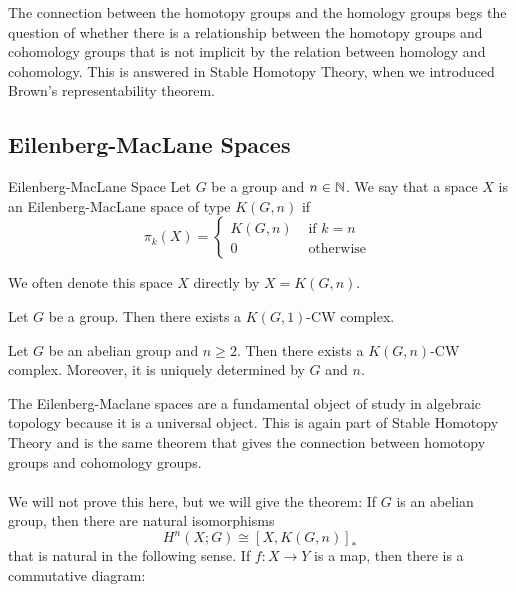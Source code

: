 \documentclass[a4paper]{article}
\begin{document}
The connection between the homotopy groups and the homology groups begs the question of whether there is a relationship between the homotopy groups and cohomology groups that is not implicit by the relation between homology and cohomology. This is answered in Stable Homotopy Theory, when we introduced Brown's representability theorem. 

\subsection{Eilenberg-MacLane Spaces}
\begin{defn}{Eilenberg-MacLane Space}{} Let $G$ be a group and $n\in\mathbb{N}$. We say that a space $X$ is an Eilenberg-MacLane space of type $K(G,n)$ if $$\pi_k(X)=\begin{cases}
K(G,n) & \text{ if } k=n\\
0 & \text{ otherwise }
\end{cases}$$
\end{defn}

We often denote this space $X$ directly by $X=K(G,n)$. 

\begin{prp}{}{} Let $G$ be a group. Then there exists a $K(G,1)$-CW complex. 
\end{prp}

\begin{thm}{}{} Let $G$ be an abelian group and $n\geq 2$. Then there exists a $K(G,n)$-CW complex. Moreover, it is uniquely determined by $G$ and $n$. 
\end{thm}

The Eilenberg-Maclane spaces are a fundamental object of study in algebraic topology because it is a universal object. This is again part of Stable Homotopy Theory and is the same theorem that gives the connection between homotopy groups and cohomology groups. \\~\\

We will not prove this here, but we will give the theorem: If $G$ is an abelian group, then there are natural isomorphisms $$H^n(X;G)\cong[X,K(G,n)]_\ast$$ that is natural in the following sense. If $f:X\to Y$ is a map, then there is a commutative diagram: \\~\\
\\~\\
\end{document}
